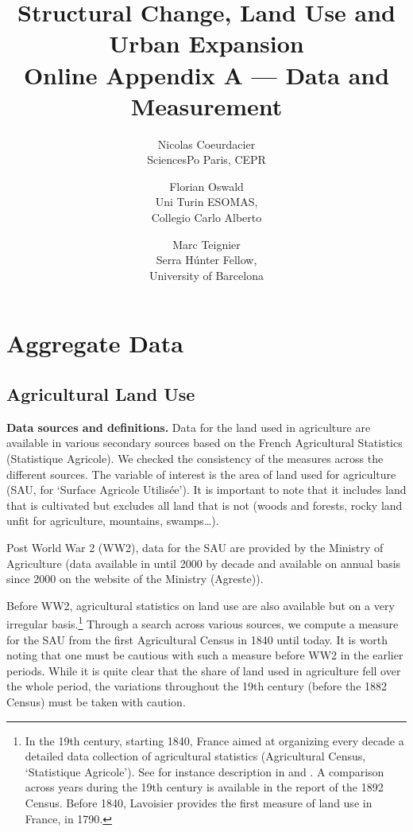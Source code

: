 \documentclass[11pt]{report}
\begin{document}
	

\title{Structural Change, Land Use and Urban Expansion\\Online Appendix A --- Data and Measurement}
\author{%
	Nicolas Coeurdacier\\ \small SciencesPo Paris, CEPR
	\and Florian Oswald\\ \small Uni Turin ESOMAS,\\\small Collegio Carlo Alberto
	\and Marc Teignier\\ \small Serra Húnter Fellow, \\\small University of Barcelona
}

\maketitle



\tableofcontents 

\newpage
\section{Aggregate Data}\label{A-sec:aggregate}
\subsection{Agricultural Land Use}\label{A-sec:agricultural-landuse}

\textbf{Data sources and definitions.} Data for the land used in agriculture are available in various secondary sources based on the French Agricultural Statistics (Statistique Agricole). We checked the consistency of the measures across the different sources. The variable of interest is the area of land used for agriculture (SAU, for `Surface Agricole Utilisée'). It is important to note that it includes land that is cultivated but excludes all land that is not (woods and forests, rocky land unfit for agriculture, mountains, swamps…).

Post World War 2 (WW2), data for the SAU are provided by the Ministry of Agriculture (data available in \cite{desriers2007agriculture} until 2000 by decade and available on annual basis since 2000 on the website of the Ministry (Agreste)). 

Before WW2, agricultural statistics on land use are also available but on a very irregular basis.\footnote{In the 19th century, starting 1840, France aimed at organizing every decade a detailed data collection of agricultural statistics (Agricultural Census, `Statistique Agricole'). See for instance description in \cite{flechey1898statistique} and \cite{auge1945statistiques}. A comparison across years during the 19th century is available in the report of the 1892 Census. Before 1840, Lavoisier provides the first measure of land use in France, in 1790.} Through a search across various sources, we compute a measure for the SAU from the first Agricultural Census in 1840 until today. It is worth noting that one must be cautious with such a measure before WW2 in the earlier periods. While it is quite clear that the share of land used in agriculture fell over the whole period, the variations throughout the 19th century (before the 1882 Census) must be taken with caution. 
\end{document}
